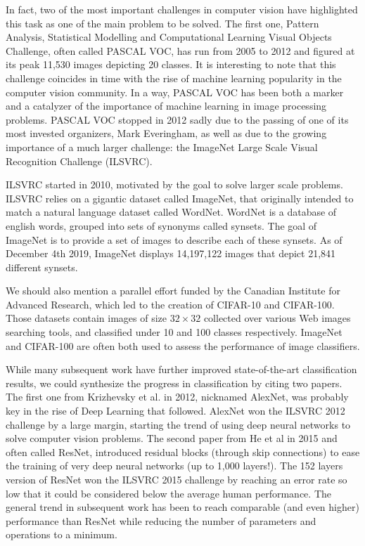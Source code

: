 In fact, two of the most important challenges in computer vision have highlighted this task as one of the main problem to be solved. The first one, Pattern Analysis, Statistical Modelling and Computational Learning Visual Objects Challenge, often called PASCAL VOC, has run from 2005 to 2012 and figured at its peak 11,530 images depicting 20 classes. It is interesting to note that this challenge coincides in time with the rise of machine learning popularity in the computer vision community. In a way, PASCAL VOC has been both a marker and a catalyzer of the importance of machine learning in image processing problems. PASCAL VOC stopped in 2012 sadly due to the passing of one of its most invested organizers, Mark Everingham, as well as due to the growing importance of a much larger challenge: the ImageNet Large Scale Visual Recognition Challenge (ILSVRC).

ILSVRC started in 2010, motivated by the goal to solve larger scale problems. ILSVRC relies on a gigantic dataset called ImageNet, that originally intended to match a natural language dataset called WordNet. WordNet is a database of english words, grouped into sets of synonyms called synsets. The goal of ImageNet is to provide a set of images to describe each of these synsets. As of December 4th 2019, ImageNet displays 14,197,122 images that depict 21,841 different synsets.

We should also mention a parallel effort funded by the Canadian Institute for Advanced Research, which led to the creation of CIFAR-10 and CIFAR-100. Those datasets contain images of size $32 \times 32$ collected over various Web images searching tools, and classified under 10 and 100 classes respectively. ImageNet and CIFAR-100 are often both used to assess the performance of image classifiers.

While many subsequent work have further improved state-of-the-art classification results, we could synthesize the progress in classification by citing two papers. The first one from Krizhevsky et al. in 2012, nicknamed AlexNet, was probably key in the rise of Deep Learning that followed. AlexNet won the ILSVRC 2012 challenge by a large margin, starting the trend of using deep neural networks to solve computer vision problems. The second paper from He et al in 2015 and often called ResNet, introduced residual blocks (through skip connections) to ease the training of very deep neural networks (up to 1,000 layers!). The 152 layers version of ResNet won the ILSVRC 2015 challenge by reaching an error rate so low that it could be considered below the average human performance. The general trend in subsequent work has been to reach comparable (and even higher) performance than ResNet while reducing the number of parameters and operations to a minimum.  

